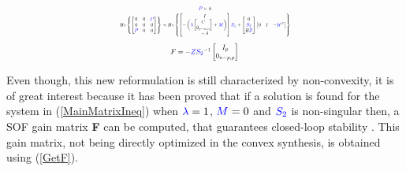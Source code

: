 \vspace{-0.5cm}
\begin{equation}
\centering
\resizebox{0.45\textwidth}{!}{$
  \begin{gathered}
        \textcolor{blue}{P} \succ 0 \\
        He\left\{ \begin{bmatrix}
            0 & 0 & \textcolor{blue}{P}\\
            0 & 0 & 0\\
            \textcolor{blue}{P} & 0 & 0
        \end{bmatrix}\right\}
    \prec
    He\left\{\begin{bmatrix}
            I\\
            -\begin{pmatrix} \textcolor{blue}{\lambda} \begin{bmatrix}
                C\\
                0_{p-n,n}                
            \end{bmatrix} + \textcolor{blue}{M}\end{pmatrix}\\
            -A
    \end{bmatrix}
    \textcolor{blue}{S_1} +
    \begin{bmatrix}
        0\\
        \textcolor{blue}{S_2}\\
        B\textcolor{blue}{Z}
    \end{bmatrix}
    \begin{bmatrix}
        0 & I & -\textcolor{blue}{H}^T
    \end{bmatrix}\right\}
    \end{gathered}$}
    \label{MainMatrixIneq}
\end{equation}
\begin{equation}
\resizebox{0.18\textwidth}{!}{$
    F = -\textcolor{blue}{Z} \textcolor{blue}{S_2}^{-1} \begin{bmatrix} I_p \\ 0_{n-p,p} \end{bmatrix}$}
    \label{GetF}
\end{equation}


Even though, this new reformulation is still characterized by non-convexity, it is of great interest because it has been proved that if a solution is found for the system in (\ref{MainMatrixIneq}) when $\textcolor{blue}{\lambda} = 1$, $\textcolor{blue}{M} = 0$ and $\textcolor{blue}{S_2}$ is non-singular then, a SOF gain matrix \textbf{F} can be computed, that guarantees closed-loop stability \cite{Arzelier2018}. This gain matrix, not being directly optimized in the convex synthesis, is obtained using (\ref{GetF}). 

